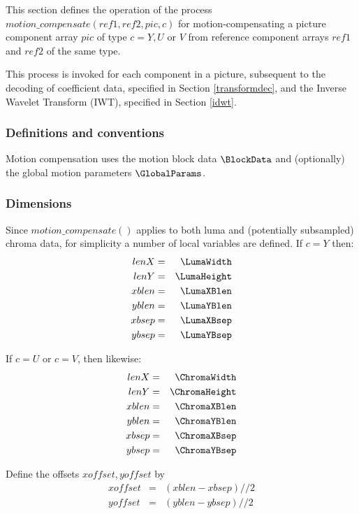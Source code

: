 \label{motioncompensate}

This section defines the operation of the process
$motion\_compensate(ref1, ref2,  pic, c)$ for motion-compensating a
picture component array  $pic$ of type $c=Y, U$ or $V$ from reference 
component arrays $ref1$ and $ref2$ of the same type.

This process is invoked for each component in a picture, subsequent to the 
decoding of coefficient data, specified in Section \ref{transformdec}, and the Inverse Wavelet 
Transform (IWT), specified in Section \ref{idwt}. 

\subsubsection{Definitions and conventions}

Motion compensation uses the motion block data $\BlockData$ and (optionally) the
global motion parameters $\GlobalParams$.

\subsubsection{Dimensions}

Since $motion\_compensate()$ applies to both luma and (potentially subsampled)
chroma data, for simplicity a number of local variables are defined. If $c=Y$ then:
\begin{eqnarray*}
lenX & = & \LumaWidth \\
lenY & = & \LumaHeight \\
xblen & = & \LumaXBlen \\
yblen & = & \LumaYBlen \\
xbsep & = & \LumaXBsep \\
ybsep & = & \LumaYBsep
\end{eqnarray*}

If $c=U$ or $c=V$, then likewise:
\begin{eqnarray*}
lenX & = & \ChromaWidth \\
lenY & = & \ChromaHeight \\
xblen & = & \ChromaXBlen \\
yblen & = & \ChromaYBlen \\
xbsep & = & \ChromaXBsep \\
ybsep & = & \ChromaYBsep
\end{eqnarray*}

Define the offsets $xoffset, yoffset$ by
\begin{eqnarray*}
xoffset & = & (xblen-xbsep)//2 \\
yoffset & = & (yblen-ybsep)//2
\end{eqnarray*}

